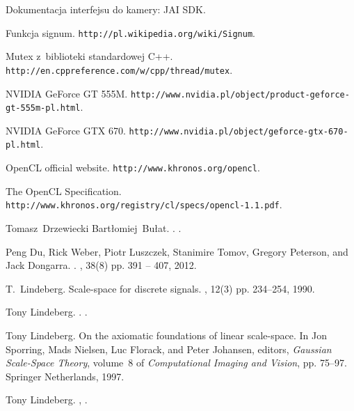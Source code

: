 \documentclass[pdflatex,11pt]{aghdpl}
\author{Tomasz Drzewiecki}
\date{2013}
\begin{document}
\titlepages

\tableofcontents
\clearpage










%
%
%
%


%

\begin{thebibliography}{10}

{Dokumentacja interfejsu do kamery: JAI SDK}.

Funkcja signum.
\newblock \texttt{http://pl.wikipedia.org/wiki/Signum}.

{Mutex z~biblioteki standardowej C++}.
\newblock \texttt{http://en.cppreference.com/w/cpp/thread/mutex}.

{NVIDIA GeForce GT 555M}.
\newblock \texttt{http://www.nvidia.pl/object/product-geforce-gt-555m-pl.html}.

{NVIDIA GeForce GTX 670}.
\newblock \texttt{http://www.nvidia.pl/object/geforce-gtx-670-pl.html}.

{OpenCL official website}.
\newblock \texttt{http://www.khronos.org/opencl}.

{The OpenCL Specification}.
\newblock \texttt{http://www.khronos.org/registry/cl/specs/opencl-1.1.pdf}.

Tomasz~Drzewiecki Bartłomiej~Bułat.
.
.

Peng Du, Rick Weber, Piotr Luszczek, Stanimire Tomov, Gregory Peterson, and
  Jack Dongarra.
.
, 38(8) pp. 391 -- 407, 2012.

T.~Lindeberg.
\newblock Scale-space for discrete signals.
, 12(3) pp. 234--254, 1990.

Tony Lindeberg.
.
.

Tony Lindeberg.
\newblock On the axiomatic foundations of linear scale-space.
\newblock In Jon Sporring, Mads Nielsen, Luc Florack, and Peter Johansen,
  editors, {\em Gaussian Scale-Space Theory}, volume~8 of {\em Computational
  Imaging and Vision}, pp. 75--97. Springer Netherlands, 1997.

Tony Lindeberg.
,
.

\end{thebibliography}

%

\appendix





\end{document}
